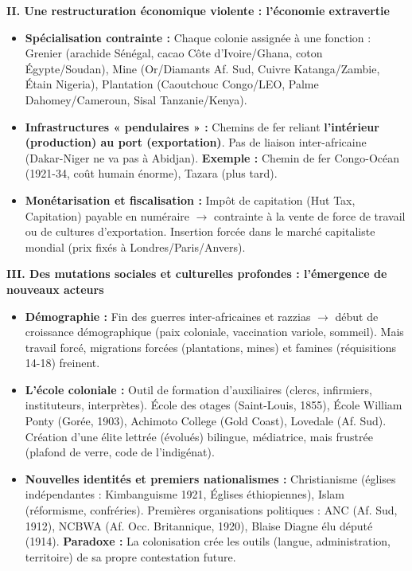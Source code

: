 \documentclass[11pt]{article}
\newcommand{\cle}[1]{{\popxbold\color{popdark}#1}}
\begin{document}
\begin{exoresolu}
\textbf{II. Une restructuration économique violente : l'économie extravertie}
\begin{itemize}
    \item \textbf{Spécialisation contrainte :} Chaque colonie assignée à une fonction : \cle{Grenier} (arachide Sénégal, cacao Côte d'Ivoire/Ghana, coton Égypte/Soudan), \cle{Mine} (Or/Diamants Af. Sud, Cuivre Katanga/Zambie, Étain Nigeria), \cle{Plantation} (Caoutchouc Congo/LEO, Palme Dahomey/Cameroun, Sisal Tanzanie/Kenya).
    \item \textbf{Infrastructures « pendulaires » :} Chemins de fer reliant \textbf{l'intérieur (production) au port (exportation)}. Pas de liaison inter-africaine (Dakar-Niger ne va pas à Abidjan). \textbf{Exemple :} Chemin de fer \cle{Congo-Océan} (1921-34, coût humain énorme), \cle{Tazara} (plus tard).
    \item \textbf{Monétarisation et fiscalisation :} Impôt de capitation (\cle{Hut Tax}, \cle{Capitation}) payable en numéraire $\to$ contrainte à la vente de force de travail ou de cultures d'exportation. Insertion forcée dans le \cle{marché capitaliste mondial} (prix fixés à Londres/Paris/Anvers).
\end{itemize}

\textbf{III. Des mutations sociales et culturelles profondes : l'émergence de nouveaux acteurs}
\begin{itemize}
    \item \textbf{Démographie :} Fin des guerres inter-africaines et razzias $\to$ début de croissance démographique (paix coloniale, vaccination variole, sommeil). Mais travail forcé, migrations forcées (plantations, mines) et famines (réquisitions 14-18) freinent.
    \item \textbf{L'école coloniale :} Outil de formation d'auxiliaires (clercs, infirmiers, instituteurs, interprètes). \cle{École des otages} (Saint-Louis, 1855), \cle{École William Ponty} (Gorée, 1903), \cle{Achimoto College} (Gold Coast), \cle{Lovedale} (Af. Sud). Création d'une \cle{élite lettrée} (évolués) bilingue, médiatrice, mais frustrée (plafond de verre, code de l'indigénat).
    \item \textbf{Nouvelles identités et premiers nationalismes :} \cle{Christianisme} (églises indépendantes : Kimbanguisme 1921, Églises éthiopiennes), \cle{Islam} (réformisme, confréries). Premières organisations politiques : \cle{ANC} (Af. Sud, 1912), \cle{NCBWA} (Af. Occ. Britannique, 1920), \cle{Blaise Diagne} élu député (1914). \textbf{Paradoxe :} La colonisation crée les outils (langue, administration, territoire) de sa propre contestation future.
\end{itemize}


\end{exoresolu}
\end{document}
